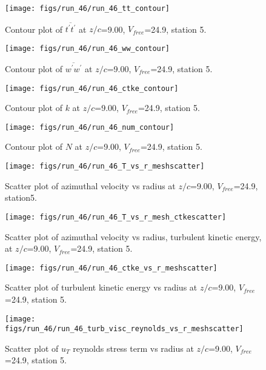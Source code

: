\begin{figure}[H]
\centering
\texttt{[image: figs/run\_46/run\_46\_tt\_contour]}
\caption{Contour plot of $\overline{t^\prime t^\prime}$ at $z/c$=9.00, $V_{free}$=24.9, station 5.}
\end{figure}


\begin{figure}[H]
\centering
\texttt{[image: figs/run\_46/run\_46\_ww\_contour]}
\caption{Contour plot of $\overline{w^\prime w^\prime}$ at $z/c$=9.00, $V_{free}$=24.9, station 5.}
\end{figure}


\begin{figure}[H]
\centering
\texttt{[image: figs/run\_46/run\_46\_ctke\_contour]}
\caption{Contour plot of $k$ at $z/c$=9.00, $V_{free}$=24.9, station 5.}
\end{figure}


\begin{figure}[H]
\centering
\texttt{[image: figs/run\_46/run\_46\_num\_contour]}
\caption{Contour plot of $N$ at $z/c$=9.00, $V_{free}$=24.9, station 5.}
\end{figure}


\begin{figure}[H]
\centering
\texttt{[image: figs/run\_46/run\_46\_T\_vs\_r\_meshscatter]}
\caption{Scatter plot of azimuthal velocity vs radius at $z/c$=9.00, $V_{free}$=24.9, station5.}
\end{figure}


\begin{figure}[H]
\centering
\texttt{[image: figs/run\_46/run\_46\_T\_vs\_r\_mesh\_ctkescatter]}
\caption{Scatter plot of azimuthal velocity vs radius, turbulent kinetic energy, at $z/c$=9.00, $V_{free}$=24.9, station 5.}
\end{figure}


\begin{figure}[H]
\centering
\texttt{[image: figs/run\_46/run\_46\_ctke\_vs\_r\_meshscatter]}
\caption{Scatter plot of turbulent kinetic energy vs radius at $z/c$=9.00, $V_{free}$=24.9, station 5.}
\end{figure}


\begin{figure}[H]
\centering
\texttt{[image: figs/run\_46/run\_46\_turb\_visc\_reynolds\_vs\_r\_meshscatter]}
\caption{Scatter plot of $
u_T$ reynolds stress term vs radius at $z/c$=9.00, $V_{free}$=24.9, station 5.}
\end{figure}



